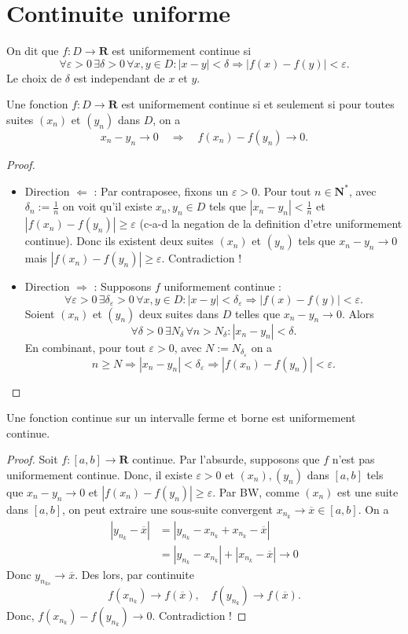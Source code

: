 \section{Continuite uniforme}
\begin{definition}
On dit que $f:D\to \mathbf{R}$ est uniformement continue si
$$
\forall\varepsilon>0\,\exists\delta>0\,\forall x,y\in D:|x-y|<\delta \Rightarrow |f(x)-f(y)|<\varepsilon.
$$
Le choix de $\delta$ est independant de $x$ et $y$.
\end{definition}
\begin{proposition}
Une fonction $f:D\to \mathbf{R}$ est uniformement continue si et seulement si pour toutes suites $(x_{n})$ et $(y_{n})$ dans $D$, on a
$$
x_{n}-y_{n}\to 0 \quad \Rightarrow \quad f(x_{n})-f(y_{n})\to0.
$$
\end{proposition}
\begin{proof}
\begin{itemize}
\item Direction $\Leftarrow$ : Par contraposee, fixons un $\varepsilon>0$. Pour tout $n\in \mathbf{N}^{*}$, avec $\delta _{n}:=\frac{1}{n}$ on voit qu'il existe $x_{n},y_{n}\in D$ tels que $|x_{n}-y_{n}|< \frac{1}{n}$ et $|f(x_{n})-f(y_{n})|\ge \varepsilon$ (c-a-d la negation de la definition d'etre uniformement continue). Donc ils existent deux suites $(x_{n})$ et $(y_{n})$ tels que $x_{n}-y_{n}\to 0$ mais $|f(x_{n})-f(y_{n})|\ge \varepsilon$. Contradiction !
\item Direction $\Rightarrow$ : Supposons $f$ uniformement continue :
$$
\forall\varepsilon>0\,\exists\delta _{\varepsilon}>0\,\forall x,y\in D:|x-y|<\delta _{\varepsilon}\Rightarrow |f(x)-f(y)|<\varepsilon.
$$
Soient $(x_{n})$ et $(y_{n})$ deux suites dans $D$ telles que $x_{n}-y_{n}\to 0$. Alors 
$$
\forall\delta>0\,\exists N_{\delta}\,\forall n>N_{\delta}:|x_{n}-y_{n}|<\delta.
$$
En combinant, pour tout $\varepsilon>0$, avec $N:=N_{\delta _{\varepsilon}}$ on a 
$$
n\ge N\Rightarrow |x_{n}-y_{n}|<\delta _{\varepsilon} \Rightarrow |f(x_{n})-f(y_{n})|<\varepsilon.
$$
\end{itemize}
\end{proof}
\begin{theorem}[Heine]
Une fonction continue sur un intervalle ferme et borne est uniformement continue.
\end{theorem}
\begin{proof}
Soit $f:[a,b]\to \mathbf{R}$ continue. Par l'absurde, supposons que $f$ n'est pas uniformement continue. Donc, il existe $\varepsilon>0$ et $(x_{n}),(y_{n})$ dans $[a,b]$ tels que $x_{n}-y_{n}\to0$ et $|f(x_{n})-f(y_{n})|\ge \varepsilon$. Par BW, comme $(x_{n})$ est une suite dans $[a,b]$, on peut extraire une sous-suite convergent $x_{n_{k}}\to \overline{x}\in [a,b]$. On a 
\begin{align*}
|y_{n_{k}}-\overline{x}| & =|y_{n_{k}}-x_{n_{k}}+x_{n_{k}}-\overline{x}| \\
 & =|y_{n_{k}}-x_{n_{k}}|+|x_{n_{k}}-\overline{x}|\to0
\end{align*}
Donc $y_{n_{ks}}\to \overline{x}$. Des lors, par continuite 
$$
f(x_{n_{k}})\to f(\overline{x}),\quad f(y_{n_{k}})\to f(\overline{x}).
$$
Donc, $f(x_{n_{k}})-f(y_{n_{k}})\to 0$. Contradiction !
\end{proof}
